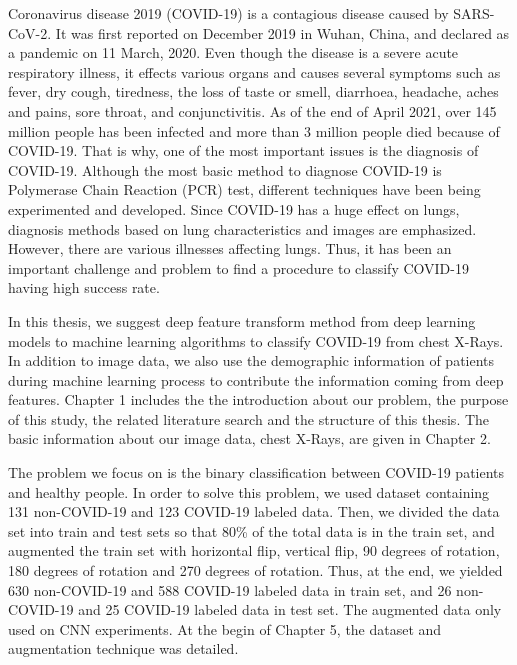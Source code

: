 Coronavirus disease 2019 (COVID-19) is a contagious disease caused by SARS-CoV-2. It was first reported on December 2019 in Wuhan, China, and declared as a pandemic on 11 March, 2020. Even though the disease is a severe acute respiratory illness, it effects various organs and causes several symptoms such as fever, dry cough, tiredness, the loss of taste or smell, diarrhoea, headache, aches and pains, sore throat, and conjunctivitis. As of the end of April 2021, over 145 million people has been infected and more than 3 million people died because of COVID-19. That is why, one of the most important issues is the diagnosis of COVID-19. Although the most basic method to diagnose COVID-19 is Polymerase Chain Reaction (PCR) test, different techniques have been being experimented and developed. Since COVID-19 has a huge effect on lungs, diagnosis methods based on lung characteristics and images are emphasized. However, there are various illnesses affecting lungs. Thus, it has been an important challenge and problem to find a procedure to classify COVID-19 having high success rate.

In this thesis, we suggest deep feature transform method from deep learning models to machine learning algorithms to classify COVID-19 from chest X-Rays. In addition to image data, we also use the demographic information of patients during machine learning process to contribute the information coming from deep features. Chapter 1 includes the the introduction about our problem, the purpose of this study, the related literature search and the structure of this thesis. The basic information about our image data, chest X-Rays, are given in Chapter 2.

The problem we focus on is the binary classification between COVID-19 patients and healthy people. In order to solve this problem, we used dataset containing 131 non-COVID-19 and 123 COVID-19 labeled data. Then, we divided the data set into train and test sets so that 80\% of the total data is in the train set, and augmented the train set with horizontal flip, vertical flip, 90 degrees of rotation, 180 degrees of rotation and 270 degrees of rotation. Thus, at the end, we yielded 630 non-COVID-19 and 588 COVID-19 labeled data in train set, and 26 non-COVID-19 and 25 COVID-19 labeled data in test set. The augmented data only used on CNN experiments. At the begin of Chapter 5, the dataset and augmentation technique was detailed.

